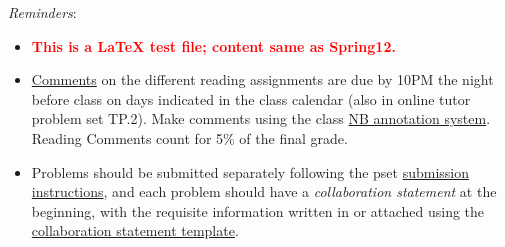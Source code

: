 \documentclass[handout]{mcs}
\begin{document}
\renewcommand{\reading}{\textbf{UNDER CONSTRUCTION}

Part~\bref{part:proofs}{. \emph{Proofs:
      Introduction}}, Chapter~\bref{proofs_chap}{, \emph{What is a
      Proof?}}; Chapter~\bref{well_ordering_chap}{, \emph{The Well
      Ordering Principle}}; and Chapter~\bref{logicform_chap}{ through
    \bref{SAT_sec}{, covering \emph{Propositional Logic}}}.  These
  assigned readings \textbf{do not include the Problem sections}.  (Many
  of the problems in the text will appear as class or homework problems.)}


  \emph{Reminders}:
\begin{itemize}

\item   \textcolor{red}{\textbf{This is a LaTeX test file; content
  same as Spring12.}}

\item 

  \href{http://courses.csail.mit.edu/6.042/spring13/courseinfo#comments}{Comments}
  on the different reading assignments are due by 10PM the night
  before class on days indicated in the class calendar (also in online
  tutor problem set TP.2).  Make comments using the class
  \href{http://nb.csail.mit.edu}{NB annotation system}.  Reading
  Comments count for 5\% of the final grade.

\item Problems should be submitted separately following the pset
  \href{http://courses.csail.mit.edu/6.042/spring13/submission}{submission
    instructions}, and each problem should have a \emph{collaboration
    statement} at the beginning, with the requisite information
  written in or attached using the
  \href{http://courses.csail.mit.edu/6.042/spring13/submission_template.pdf}{collaboration
    statement template}.

 \end{itemize}








\iffalse
\begin{center}
\large \textbf{Optional:}
\end{center}

\pinput{PS_faster_adder_logic}
\fi

\end{document}
